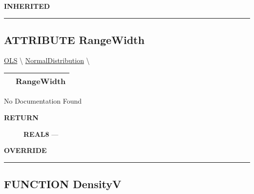 \par
\begin{description}
\item [\colorbox{tagtype}{\color{white} \textbf{\textsf{INHERITED}}}] 
\end{description}



\rule{\linewidth}{0.5pt}
\subsection*{\textsf{\colorbox{headtoc}{\color{white} ATTRIBUTE}
RangeWidth}}

\hypertarget{ecldoc:linearregression.ols.distributionbase.rangewidth}{}
\hspace{0pt} \hyperlink{ecldoc:linearregression.ols}{OLS} \textbackslash 
\hspace{0pt} \hyperlink{ecldoc:linearregression.ols.normaldistribution}{NormalDistribution} \textbackslash 

{\renewcommand{\arraystretch}{1.5}
\begin{tabularx}{\textwidth}{|>{\raggedright\arraybackslash}l|X|}
\hline
\hspace{0pt}\mytexttt{\color{red} } & \textbf{RangeWidth} \\
\hline
\end{tabularx}
}

\par





No Documentation Found








\par
\begin{description}
\item [\colorbox{tagtype}{\color{white} \textbf{\textsf{RETURN}}}] \textbf{REAL8} --- 
\end{description}






\par
\begin{description}
\item [\colorbox{tagtype}{\color{white} \textbf{\textsf{OVERRIDE}}}] 
\end{description}



\rule{\linewidth}{0.5pt}
\subsection*{\textsf{\colorbox{headtoc}{\color{white} FUNCTION}
DensityV}}

